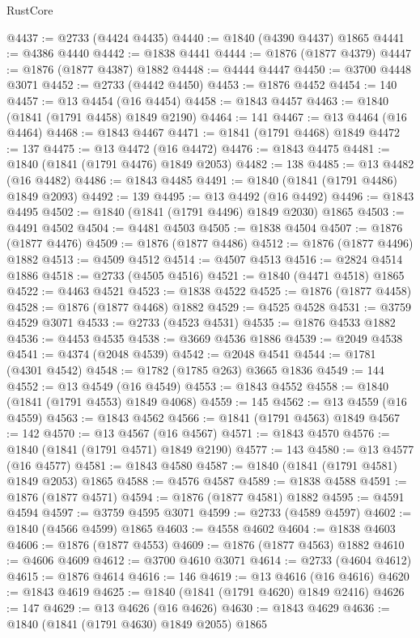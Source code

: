 \begin{lexlean}{RustCore}
\begin{coremodule}
@4437 := @2733 (@4424 @4435)
@4440 := @1840 (@4390 @4437) @1865
@4441 := @4386 @4440
@4442 := @1838 @4441
@4444 := @1876 (@1877 @4379)
@4447 := @1876 (@1877 @4387) @1882
@4448 := @4444 @4447
@4450 := @3700 @4448 @3071
@4452 := @2733 (@4442 @4450)
@4453 := @1876 @4452
@4454 := 140
@4457 := @13 @4454 (@16 @4454)
@4458 := @1843 @4457
@4463 := @1840 (@1841 (@1791 @4458) @1849 @2190)
@4464 := 141
@4467 := @13 @4464 (@16 @4464)
@4468 := @1843 @4467
@4471 := @1841 (@1791 @4468) @1849
@4472 := 137
@4475 := @13 @4472 (@16 @4472)
@4476 := @1843 @4475
@4481 := @1840 (@1841 (@1791 @4476) @1849 @2053)
@4482 := 138
@4485 := @13 @4482 (@16 @4482)
@4486 := @1843 @4485
@4491 := @1840 (@1841 (@1791 @4486) @1849 @2093)
@4492 := 139
@4495 := @13 @4492 (@16 @4492)
@4496 := @1843 @4495
@4502 := @1840 (@1841 (@1791 @4496) @1849 @2030) @1865
@4503 := @4491 @4502
@4504 := @4481 @4503
@4505 := @1838 @4504
@4507 := @1876 (@1877 @4476)
@4509 := @1876 (@1877 @4486)
@4512 := @1876 (@1877 @4496) @1882
@4513 := @4509 @4512
@4514 := @4507 @4513
@4516 := @2824 @4514 @1886
@4518 := @2733 (@4505 @4516)
@4521 := @1840 (@4471 @4518) @1865
@4522 := @4463 @4521
@4523 := @1838 @4522
@4525 := @1876 (@1877 @4458)
@4528 := @1876 (@1877 @4468) @1882
@4529 := @4525 @4528
@4531 := @3759 @4529 @3071
@4533 := @2733 (@4523 @4531)
@4535 := @1876 @4533 @1882
@4536 := @4453 @4535
@4538 := @3669 @4536 @1886
@4539 := @2049 @4538
@4541 := @4374 (@2048 @4539)
@4542 := @2048 @4541
@4544 := @1781 (@4301 @4542)
@4548 := @1782 (@1785 @263) @3665 @1836
@4549 := 144
@4552 := @13 @4549 (@16 @4549)
@4553 := @1843 @4552
@4558 := @1840 (@1841 (@1791 @4553) @1849 @4068)
@4559 := 145
@4562 := @13 @4559 (@16 @4559)
@4563 := @1843 @4562
@4566 := @1841 (@1791 @4563) @1849
@4567 := 142
@4570 := @13 @4567 (@16 @4567)
@4571 := @1843 @4570
@4576 := @1840 (@1841 (@1791 @4571) @1849 @2190)
@4577 := 143
@4580 := @13 @4577 (@16 @4577)
@4581 := @1843 @4580
@4587 := @1840 (@1841 (@1791 @4581) @1849 @2053) @1865
@4588 := @4576 @4587
@4589 := @1838 @4588
@4591 := @1876 (@1877 @4571)
@4594 := @1876 (@1877 @4581) @1882
@4595 := @4591 @4594
@4597 := @3759 @4595 @3071
@4599 := @2733 (@4589 @4597)
@4602 := @1840 (@4566 @4599) @1865
@4603 := @4558 @4602
@4604 := @1838 @4603
@4606 := @1876 (@1877 @4553)
@4609 := @1876 (@1877 @4563) @1882
@4610 := @4606 @4609
@4612 := @3700 @4610 @3071
@4614 := @2733 (@4604 @4612)
@4615 := @1876 @4614
@4616 := 146
@4619 := @13 @4616 (@16 @4616)
@4620 := @1843 @4619
@4625 := @1840 (@1841 (@1791 @4620) @1849 @2416)
@4626 := 147
@4629 := @13 @4626 (@16 @4626)
@4630 := @1843 @4629
@4636 := @1840 (@1841 (@1791 @4630) @1849 @2055) @1865

\end{coremodule}
\end{lexlean}
